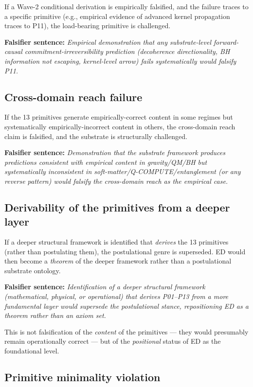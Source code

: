 \documentclass[11pt,a4paper]{article}
\begin{document}
If a Wave-2 conditional derivation is empirically falsified, and the failure traces to a specific primitive (e.g., empirical evidence of advanced kernel propagation traces to P11), the load-bearing primitive is challenged.

\textbf{Falsifier sentence:} \emph{Empirical demonstration that any substrate-level forward-causal commitment-irreversibility prediction (decoherence directionality, BH information not escaping, kernel-level arrow) fails systematically would falsify P11.}

\subsection{Cross-domain reach failure}

If the 13 primitives generate empirically-correct content in some regimes but systematically empirically-incorrect content in others, the cross-domain reach claim is falsified, and the substrate is structurally challenged.

\textbf{Falsifier sentence:} \emph{Demonstration that the substrate framework produces predictions consistent with empirical content in gravity/QM/BH but systematically inconsistent in soft-matter/Q-COMPUTE/entanglement (or any reverse pattern) would falsify the cross-domain reach as the empirical case.}

\subsection{Derivability of the primitives from a deeper layer}

If a deeper structural framework is identified that \emph{derives} the 13 primitives (rather than postulating them), the postulational genre is superseded. ED would then become a \emph{theorem} of the deeper framework rather than a postulational substrate ontology.

\textbf{Falsifier sentence:} \emph{Identification of a deeper structural framework (mathematical, physical, or operational) that derives P01--P13 from a more fundamental layer would supersede the postulational stance, repositioning ED as a theorem rather than an axiom set.}

This is not falsification of the \emph{content} of the primitives --- they would presumably remain operationally correct --- but of the \emph{positional} status of ED as the foundational level.

\subsection{Primitive minimality violation}
\end{document}
